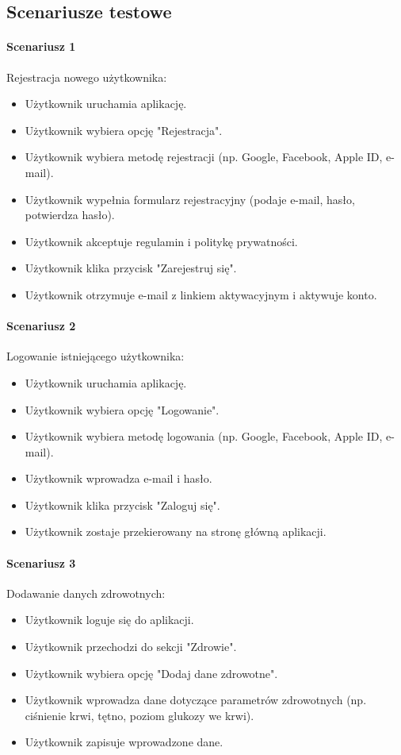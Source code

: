 \begin{center}
  \subsection{Scenariusze testowe}
\end{center}

\paragraph{Scenariusz 1} Rejestracja nowego użytkownika:
\begin{itemize}
  \item Użytkownik uruchamia aplikację.
  \item Użytkownik wybiera opcję "Rejestracja".
  \item Użytkownik wybiera metodę rejestracji (np. Google, Facebook, Apple ID, e-mail).
  \item Użytkownik wypełnia formularz rejestracyjny (podaje e-mail, hasło, potwierdza hasło).
  \item Użytkownik akceptuje regulamin i politykę prywatności.
  \item Użytkownik klika przycisk "Zarejestruj się".
  \item Użytkownik otrzymuje e-mail z linkiem aktywacyjnym i aktywuje konto.
\end{itemize}

\paragraph{Scenariusz 2} Logowanie istniejącego użytkownika:
\begin{itemize}
  \item Użytkownik uruchamia aplikację.
  \item Użytkownik wybiera opcję "Logowanie".
  \item Użytkownik wybiera metodę logowania (np. Google, Facebook, Apple ID, e-mail).
  \item Użytkownik wprowadza e-mail i hasło.
  \item Użytkownik klika przycisk "Zaloguj się".
  \item Użytkownik zostaje przekierowany na stronę główną aplikacji.
\end{itemize}

\paragraph{Scenariusz 3} Dodawanie danych zdrowotnych:
\begin{itemize}
  \item Użytkownik loguje się do aplikacji.
  \item Użytkownik przechodzi do sekcji "Zdrowie".
  \item Użytkownik wybiera opcję "Dodaj dane zdrowotne".
  \item Użytkownik wprowadza dane dotyczące parametrów zdrowotnych (np. ciśnienie krwi, tętno, poziom glukozy we krwi).
  \item Użytkownik zapisuje wprowadzone dane.
\end{itemize}

